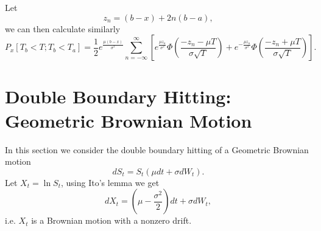 Let 
\begin{equation}
  z_n = (b-x) + 2n (b-a), 
\end{equation}
we can then calculate similarly
\begin{equation}
  P_x[T_b<T; T_b<T_a]  
    = \frac{1}{2} e^{\frac{\mu (b-x)}{\sigma^2}} 
      \sum_{n=-\infty}^{\infty}
      \left[
        e^{\frac{\mu z_n}{\sigma^2}} 
          \Phi\left( \frac{-z_n - \mu T}{\sigma \sqrt{T}} \right)
      + e^{-\frac{\mu z_n}{\sigma^2}} 
          \Phi\left( \frac{-z_n + \mu T}{\sigma \sqrt{T}} \right)
      \right].
\end{equation}








\section{Double Boundary Hitting: Geometric Brownian Motion}
In this section we consider the double boundary hitting of a Geometric Brownian 
motion 
\[
	dS_t = S_t(\mu dt + \sigma dW_t).
\]
Let $X_t = \ln{S_t}$, using Ito's lemma we get
\[
	dX_t = (\mu-\frac{\sigma^2}{2})dt + \sigma dW_t,
\]
i.e. $X_t$ is a Brownian motion with a nonzero drift.

